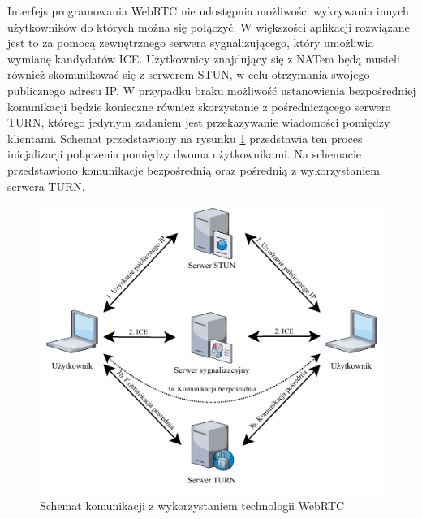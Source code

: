 \documentclass[language=polish,type=master]{aghmodern}
\begin{document}
Interfejs programowania WebRTC nie udostępnia możliwości wykrywania innych użytkowników do których można się połączyć.
W większości aplikacji rozwiązane jest to za pomocą zewnętrznego serwera sygnalizującego, który umożliwia wymianę kandydatów ICE\footnotemark{}.
Użytkownicy znajdujący się z NATem\footnotemark{} będą musieli również
skomunikować się z serwerem STUN\footnotemark{}, w celu otrzymania swojego publicznego adresu IP.
W przypadku braku możliwość ustanowienia bezpośredniej komunikacji będzie konieczne również skorzystanie z pośredniczącego serwera TURN\footnotemark{}, którego jedynym zadaniem jest przekazywanie wiadomości pomiędzy klientami.
Schemat przedstawiony na rysunku \ref{fig:webrtc} przedstawia ten proces inicjalizacji połączenia pomiędzy dwoma użytkownikami.
Na schemacie przedstawiono komunikacje bezpośrednią oraz pośrednią z wykorzystaniem serwera TURN.

\begin{figure}[H]
    \centering
    \vspace*{15pt}
    \includegraphics[width=\textwidth]{images/webrtc.pdf}
    \caption{Schemat komunikacji z wykorzystaniem technologii WebRTC}
    \label{fig:webrtc}
\end{figure}
\end{document}
